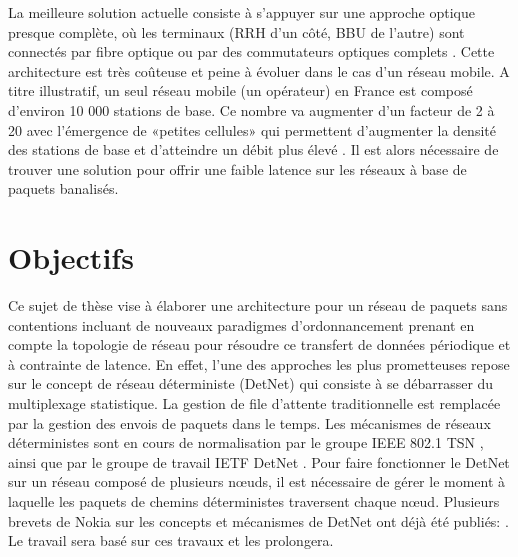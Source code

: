 \documentclass{article}
\begin{document}
La meilleure solution actuelle consiste à s'appuyer sur une approche optique presque complète, où les terminaux (RRH d'un côté, BBU de l'autre) sont connectés par fibre optique ou par des commutateurs optiques complets \cite{5gppparchitecture}. Cette architecture est très coûteuse et peine à évoluer dans le cas d'un réseau mobile. A titre illustratif, un seul réseau mobile (un opérateur) en France est composé d'environ 10 000 stations de base. Ce nombre va augmenter d'un facteur de 2 à 20 avec l'émergence de «petites cellules» qui permettent d'augmenter la densité des stations de base et d'atteindre un débit plus élevé \cite{5gppparchitecture}. Il est alors nécessaire de trouver une solution pour offrir une faible latence sur les réseaux à base de paquets banalisés.

\section*{Objectifs}
Ce sujet de thèse vise à élaborer une architecture pour un réseau de paquets sans contentions incluant de nouveaux paradigmes d'ordonnancement prenant en compte la topologie de réseau pour résoudre ce transfert de données périodique et à contrainte de latence. En effet, l'une des approches les plus prometteuses repose sur le concept de réseau déterministe (DetNet) qui consiste à se débarrasser du multiplexage statistique. La gestion de file d'attente traditionnelle est remplacée par la gestion des envois de paquets dans le temps. Les mécanismes de réseaux déterministes sont en cours de normalisation par le groupe IEEE 802.1 TSN \cite{ieee802}, ainsi que par le groupe de travail IETF DetNet \cite{finn-detnet-architecture-08}. Pour faire fonctionner le DetNet sur un réseau composé de plusieurs nœuds, il est nécessaire de gérer le moment à laquelle les paquets de chemins déterministes traversent chaque nœud. Plusieurs brevets de Nokia sur les concepts et mécanismes de DetNet ont déjà été publiés: \cite{howe2005time, leclerc2015contention, leclerc2016signaling, leclerc2016transmission, roos1994method, coherentflow}. Le travail sera basé sur ces travaux et les prolongera. \\
\end{document}
